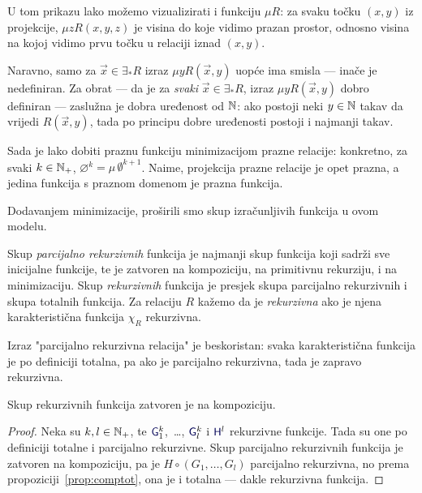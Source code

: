 U tom prikazu lako možemo vizualizirati i funkciju $\mu R$: za svaku točku $(x,y)$ iz projekcije, $\mu zR(x,y,z)$ je visina do koje vidimo prazan prostor, odnosno visina na kojoj vidimo prvu točku u relaciji iznad $(x,y)$. 

Naravno, samo za $\vec x\in\exists_*R$ izraz $\mu yR(\vec x,y)$ uopće ima smisla --- inače je nedefiniran. Za obrat --- da je za \emph{svaki} $\vec x\in\exists_*R$, izraz $\mu yR(\vec x,y)$ dobro definiran --- zaslužna je dobra uređenost od ${\mathbb N}$: ako postoji neki $y\in{\mathbb N}$ takav da vrijedi $R(\vec x,y)$, tada po principu dobre uređenosti postoji i najmanji takav.

\begin{primjer}\label{pr:varnothingprek}
Sada je lako dobiti praznu funkciju minimizacijom prazne relacije: konkretno, za svaki $k\in{\mathbb N}_+$, $\varnothing^k=\mu\,\emptyset^{k+1}$. Naime, projekcija prazne relacije je opet prazna, a jedina funkcija s praznom domenom je prazna funkcija.
\end{primjer}

Dodavanjem minimizacije, proširili smo skup izračunljivih funkcija u ovom modelu.

\begin{definicija}\label{def:parcrek}
Skup \emph{parcijalno rekurzivnih} funkcija je najmanji skup funkcija koji sadrži sve inicijalne funkcije, te je zatvoren na kompoziciju, na primitivnu rekurziju, i na minimizaciju. Skup \emph{rekurzivnih} funkcija je presjek skupa parcijalno rekurzivnih i skupa totalnih funkcija. Za relaciju $R$ kažemo da je \emph{rekurzivna} ako je njena karakteristična funkcija $\chi_R$ rekurzivna.
\end{definicija}

Izraz "parcijalno rekurzivna relacija" je beskoristan: svaka karakteristična funkcija je po definiciji totalna, pa ako je parcijalno rekurzivna, tada je zapravo rekurzivna.

\begin{lema}\label{lm:comprek}
Skup rekurzivnih funkcija zatvoren je na kompoziciju.
\end{lema}
\begin{proof}
Neka su $k,l\in{\mathbb N}_+$, te $\f G_1^k$,~\ldots, $\f G_l^k$ i $\f H^l$ rekurzivne funkcije. Tada su one po definiciji totalne i parcijalno rekurzivne. Skup parcijalno rekurzivnih funkcija je zatvoren na kompoziciju, pa je $H\circ(G_1,\dotsc,G_l)$ parcijalno rekurzivna, no prema propoziciji~\ref{prop:comptot}, ona je i totalna --- dakle rekurzivna funkcija.
\end{proof}

